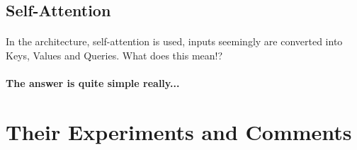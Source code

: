 \documentclass{article}
\begin{document}
    \subsection{Self-Attention}
    \paragraph{} In the architecture, self-attention is used, inputs seemingly are converted into Keys, Values and Queries. What does this mean!?
    \paragraph{The answer is quite simple really...} 


    \section{Their Experiments and Comments}
\end{document}

